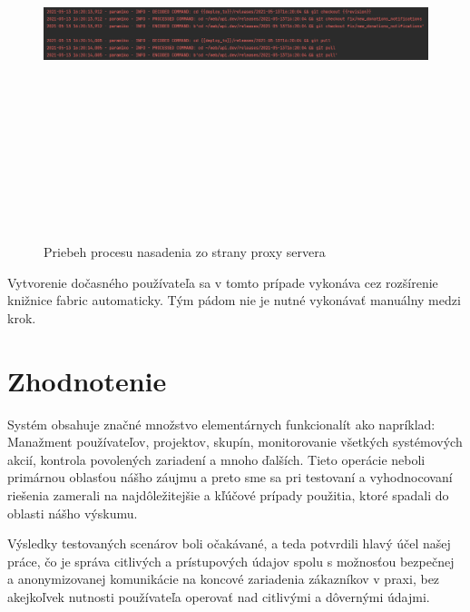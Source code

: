 \begin{figure}[H]
\begin{center}\includegraphics[width=\textwidth,height=12cm,keepaspectratio=true]{assets/log_deploy_proxy}\end{center}
\caption[Priebeh procesu nasadenia zo strany proxy servera]{Priebeh procesu nasadenia zo strany proxy servera}\label{fig:obr_22}
\end{figure}

Vytvorenie dočasného používateľa sa v tomto prípade vykonáva cez rozšírenie knižnice fabric automaticky. Tým pádom nie je nutné
vykonávať manuálny medzi krok.

\section{Zhodnotenie}\label{sec:zhodnotenie}

Systém obsahuje značné množstvo elementárnych funkcionalít ako napríklad: Manažment používateľov, projektov, skupín,
monitorovanie všetkých systémových akcií, kontrola povolených zariadení a mnoho ďalších.
Tieto operácie neboli primárnou oblasťou nášho záujmu a preto sme sa pri testovaní a vyhodnocovaní riešenia zamerali na
najdôležitejšie a kľúčové prípady použitia, ktoré spadali do oblasti nášho výskumu.

Výsledky testovaných scenárov boli očakávané, a teda potvrdili hlavý účel našej práce, čo je správa citlivých a prístupových údajov
spolu s možnosťou bezpečnej a anonymizovanej komunikácie na koncové zariadenia zákazníkov v praxi, bez akejkoľvek nutnosti
používateľa operovať nad citlivými a dôvernými údajmi.


